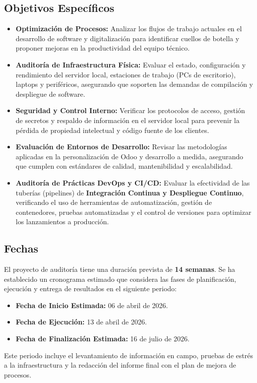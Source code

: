 \documentclass[12pt]{article}
\begin{document}
\subsection{Objetivos Específicos}
\begin{itemize}
    \item \textbf{Optimización de Procesos:} Analizar los flujos de trabajo actuales en el desarrollo de software y digitalización para identificar cuellos de botella y proponer mejoras en la productividad del equipo técnico.
    \item \textbf{Auditoría de Infraestructura Física:} Evaluar el estado, configuración y rendimiento del servidor local, estaciones de trabajo (PCs de escritorio), laptops y periféricos, asegurando que soporten las demandas de compilación y despliegue de software.
    \item \textbf{Seguridad y Control Interno:} Verificar los protocolos de acceso, gestión de secretos y respaldo de información en el servidor local para prevenir la pérdida de propiedad intelectual y código fuente de los clientes.
    \item \textbf{Evaluación de Entornos de Desarrollo:} Revisar las metodologías aplicadas en la personalización de Odoo y desarrollo a medida, asegurando que cumplen con estándares de calidad, mantenibilidad y escalabilidad.
    \item \textbf{Auditoría de Prácticas DevOps y CI/CD:} Evaluar la efectividad de las tuberías (pipelines) de \textbf{Integración Continua y Despliegue Continuo}, verificando el uso de herramientas de automatización, gestión de contenedores, pruebas automatizadas y el control de versiones para optimizar los lanzamientos a producción.
\end{itemize}

\subsection{Fechas}
El proyecto de auditoría tiene una duración prevista de \textbf{14 semanas}. Se ha establecido un cronograma estimado que considera las fases de planificación, ejecución y entrega de resultados en el siguiente periodo:
\begin{itemize}
    \item \textbf{Fecha de Inicio Estimada:} 06 de abril de 2026.
    \item \textbf{Fecha de Ejecución:} 13 de abril de 2026.
    \item \textbf{Fecha de Finalización Estimada:} 16 de julio de 2026.
\end{itemize}
Este periodo incluye el levantamiento de información en campo, pruebas de estrés a la infraestructura y la redacción del informe final con el plan de mejora de procesos.
\end{document}
